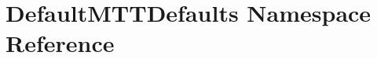 \hypertarget{namespaceDefaultMTTDefaults}{\section{Default\-M\-T\-T\-Defaults Namespace Reference}
\label{namespaceDefaultMTTDefaults}
}
